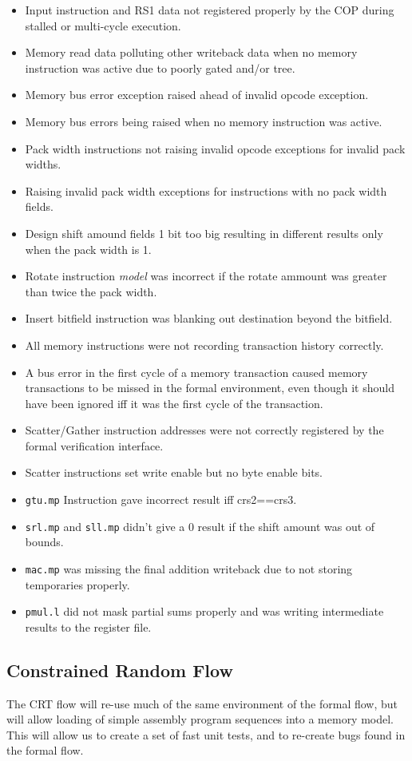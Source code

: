 \begin{itemize}
\item Input instruction and RS1 data not registered properly by the COP during
    stalled or multi-cycle execution.
\item Memory read data polluting other writeback data when no memory
    instruction was active due to poorly gated and/or tree.
\item Memory bus error exception raised ahead of invalid opcode exception.
\item Memory bus errors being raised when no memory instruction was active.
\item Pack width instructions not raising invalid opcode exceptions for
    invalid pack widths.
\item Raising invalid pack width exceptions for instructions with no pack width
    fields.
\item Design shift amound fields 1 bit too big resulting in different results
    only when the pack width is 1.
\item Rotate instruction {\em model} was incorrect if the rotate ammount was
    greater than twice the pack width.
\item Insert bitfield instruction was blanking out destination beyond the
    bitfield.
\item All memory instructions were not recording transaction history correctly.
\item A bus error in the first cycle of a memory transaction caused memory
    transactions to be missed in the formal environment, even though it
    should have been ignored iff it was the first cycle of the transaction.
\item Scatter/Gather instruction addresses were not correctly registered
    by the formal verification interface.
\item Scatter instructions set write enable but no byte enable bits.
\item {\tt gtu.mp} Instruction gave incorrect result iff crs2==crs3.
\item {\tt srl.mp} and {\tt sll.mp} didn't give a 0 result if the shift
    amount was out of bounds.
\item {\tt mac.mp} was missing the final addition writeback due to not
    storing temporaries properly.
\item {\tt pmul.l} did not mask partial sums properly and was writing
    intermediate results to the register file.
\end{itemize}

\subsection{Constrained Random Flow}

The CRT flow will re-use much of the same environment of the formal flow,
but will allow loading of simple assembly program sequences into a
memory model. This will allow us to create a set of fast unit tests, and to
re-create bugs found in the formal flow.

